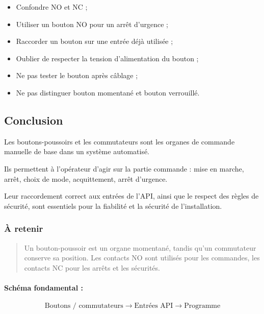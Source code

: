 \begin{itemize}
    \item Confondre NO et NC ;
    \item Utiliser un bouton NO pour un arrêt d'urgence ;
    \item Raccorder un bouton sur une entrée déjà utilisée ;
    \item Oublier de respecter la tension d'alimentation du bouton ;
    \item Ne pas tester le bouton après câblage ;
    \item Ne pas distinguer bouton momentané et bouton verrouillé.
\end{itemize}

\subsection{Conclusion}

Les boutons-poussoirs et les commutateurs sont les organes de commande manuelle de base dans un système automatisé.

Ils permettent à l'opérateur d'agir sur la partie commande : mise en marche, arrêt, choix de mode, acquittement, arrêt d'urgence.

Leur raccordement correct aux entrées de l'API, ainsi que le respect des règles de sécurité, sont essentiels pour la fiabilité et la sécurité de l'installation.

\subsubsection*{À retenir}

\begin{quote}
Un bouton-poussoir est un organe momentané, tandis qu'un commutateur conserve sa position. Les contacts NO sont utilisés pour les commandes, les contacts NC pour les arrêts et les sécurités.
\end{quote}

\paragraph{Schéma fondamental :}

\[
\text{Boutons / commutateurs} \rightarrow \text{Entrées API} \rightarrow \text{Programme}
\]